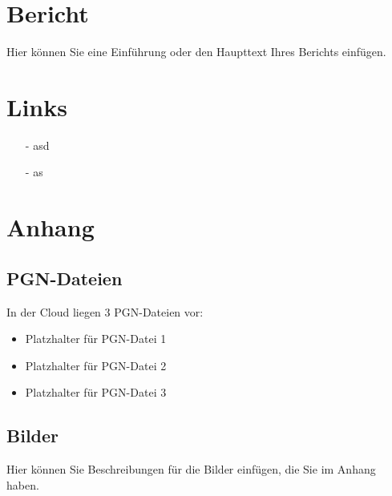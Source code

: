 \documentclass[a4paper,german]{tui-algo-seminar}
\title{\inhalt}
\author{Erik Skopp}
\newcommand{\inhalt}{28. Magdeburger A-Open 2023}
\begin{document}
\maketitle
\thispagestyle{plain} %
\begin{abstract}
Bericht: \inhalt.\\
Das 
\end{abstract}

\section{Bericht}
Hier können Sie eine Einführung oder den Haupttext Ihres Berichts einfügen.

\section{Links}
\begin{itemize}
    \item[-] asd
    \item[-] as
\end{itemize}

\section{Anhang}
\subsection{PGN-Dateien}
In der Cloud liegen 3 PGN-Dateien vor:
\begin{itemize}
    \item Platzhalter für PGN-Datei 1
    \item Platzhalter für PGN-Datei 2
    \item Platzhalter für PGN-Datei 3
\end{itemize}

\subsection{Bilder}
Hier können Sie Beschreibungen für die Bilder einfügen, die Sie im Anhang haben.
\end{document}
